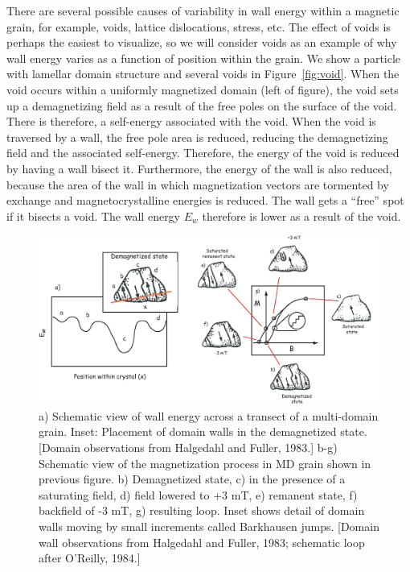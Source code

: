 There are several possible causes of variability in wall energy within a magnetic grain, for example, voids, lattice dislocations, stress, etc.  The effect of voids is perhaps the easiest to visualize, so we will consider voids as an example of why wall energy varies as a function of position within the grain.   We show a particle with lamellar domain structure and several voids in Figure~\ref{fig:void}.  When the void occurs within a uniformly magnetized domain (left of figure), the void sets up a demagnetizing field as a result of the free poles on the surface of the void.  There is therefore, a self-energy associated with the void.   When the void is traversed by a wall, the free pole area is reduced, reducing the demagnetizing field and the associated self-energy.  Therefore, the energy of the void is reduced by having a wall bisect it.  Furthermore, the energy of the wall is also reduced, because the area of the wall in which magnetization vectors are tormented by exchange and magnetocrystalline energies is reduced.  The wall gets a ``free'' spot if it bisects a void.  The wall energy $E_w$ therefore is lower as a result of the void.  




\begin{figure}[htb]
\centering  \includegraphics[width=14 cm]{EPSfiles/wallenergy.eps}
\caption{a) Schematic view of wall energy across a transect of a multi-domain grain.  Inset: Placement of domain walls in the demagnetized state.  [Domain observations from Halgedahl and Fuller,  1983.] b-g) Schematic view of the magnetization process in MD grain shown in previous figure.  b) Demagnetized state, c) in the  presence of a saturating field, d) field lowered to +3 mT, e) remanent state, f) backfield of -3 mT, g) resulting loop.  Inset shows detail of domain walls moving by small increments called Barkhausen jumps.  [Domain wall observations from Halgedahl and Fuller, 1983; schematic loop after O'Reilly, 1984.]}
\label{fig:wallenergy}
\end{figure}
\nocite{oreilly84}\nocite{halgedahl83}




